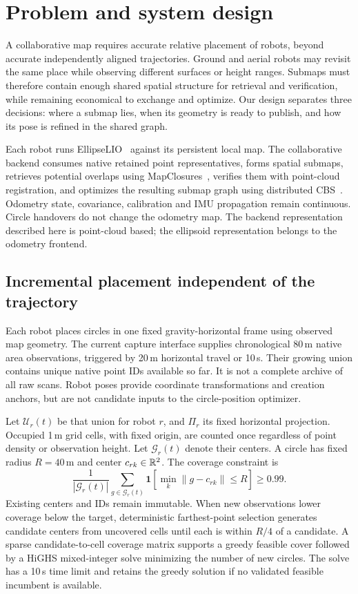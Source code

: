 \section{Problem and system design}
\label{sec:method}
A collaborative map requires accurate relative placement of robots, beyond accurate independently aligned trajectories. Ground and aerial robots may revisit the same place while observing different surfaces or height ranges. Submaps must therefore contain enough shared spatial structure for retrieval and verification, while remaining economical to exchange and optimize. Our design separates three decisions: where a submap lies, when its geometry is ready to publish, and how its pose is refined in the shared graph.

Each robot runs EllipseLIO~\cite{ellipselio} against its persistent local map. The collaborative backend consumes native retained point representatives, forms spatial submaps, retrieves potential overlaps using MapClosures~\cite{mapclosures}, verifies them with point-cloud registration, and optimizes the resulting submap graph using distributed CBS~\cite{cbs}. Odometry state, covariance, calibration and IMU propagation remain continuous. Circle handovers do not change the odometry map. The backend representation described here is point-cloud based; the ellipsoid representation belongs to the odometry frontend.

\subsection{Incremental placement independent of the trajectory}
Each robot places circles in one fixed gravity-horizontal frame using observed map geometry. The current capture interface supplies chronological 80\,m native area observations, triggered by 20\,m horizontal travel or 10\,s. Their growing union contains unique native point IDs available so far. It is not a complete archive of all raw scans. Robot poses provide coordinate transformations and creation anchors, but are not candidate inputs to the circle-position optimizer.

Let $\mathcal{U}_r(t)$ be that union for robot $r$, and $\Pi_r$ its fixed horizontal projection. Occupied 1\,m grid cells, with fixed origin, are counted once regardless of point density or observation height. Let $\mathcal{G}_r(t)$ denote their centers. A circle has fixed radius $R=40$\,m and center $c_{rk}\in\mathbb{R}^2$. The coverage constraint is
\begin{equation}
 \frac{1}{|\mathcal{G}_r(t)|}\sum_{g\in\mathcal{G}_r(t)}
 \mathbf{1}\!\left[\min_k\|g-c_{rk}\|\le R\right]\ge0.99.
 \label{eq:coverage}
\end{equation}
Existing centers and IDs remain immutable. When new observations lower coverage below the target, deterministic farthest-point selection generates candidate centers from uncovered cells until each is within $R/4$ of a candidate. A sparse candidate-to-cell coverage matrix supports a greedy feasible cover followed by a HiGHS mixed-integer solve minimizing the number of new circles. The solve has a 10\,s time limit and retains the greedy solution if no validated feasible incumbent is available.


